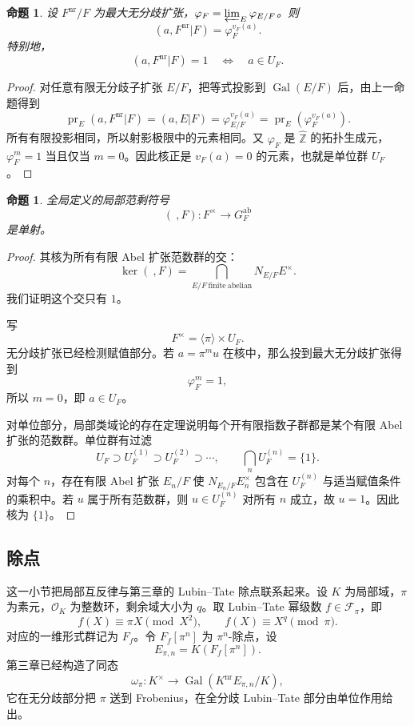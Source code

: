 \documentclass[11pt,a4paper,openany]{ctexbook}
\numberwithin{equation}{chapter}
\newcommand{\Z}{\mathbb{Z}}
\newcommand{\Gal}{\operatorname{Gal}}
\theoremstyle{plain}
\newtheorem{proposition}[theorem]{命题}
\theoremstyle{definition}
\theoremstyle{remark}
\begin{document}
\begin{proposition}
设 $F^{\mathrm{nr}}/F$ 为最大无分歧扩张，$\varphi_F=\varprojlim_E\varphi_{E/F}$。则
\[
(a,F^{\mathrm{nr}}|F)=\varphi_F^{v_F(a)}.
\]
特别地，
\[
(a,F^{\mathrm{nr}}|F)=1\quad\Longleftrightarrow\quad a\in U_F.
\]
\end{proposition}

\begin{proof}
对任意有限无分歧子扩张 $E/F$，把等式投影到 $\Gal(E/F)$ 后，由上一命题得到
\[
\operatorname{pr}_E(a,F^{\mathrm{nr}}|F)=(a,E|F)=\varphi_{E/F}^{v_F(a)}
=\operatorname{pr}_E(\varphi_F^{v_F(a)}).
\]
所有有限投影相同，所以射影极限中的元素相同。又 $\varphi_F$ 是 $\widehat{\Z}$ 的拓扑生成元，$\varphi_F^m=1$ 当且仅当 $m=0$。因此核正是 $v_F(a)=0$ 的元素，也就是单位群 $U_F$。
\end{proof}

\begin{proposition}
全局定义的局部范剩符号
\[
(\ ,F):F^\times\longrightarrow G_F^{\operatorname{ab}}
\]
是单射。
\end{proposition}

\begin{proof}
其核为所有有限 Abel 扩张范数群的交：
\[
\ker(\ ,F)=\bigcap_{E/F\ \mathrm{finite\ abelian}}N_{E/F}E^\times.
\]
我们证明这个交只有 $1$。

写
\[
F^\times=\langle\pi\rangle\times U_F.
\]
无分歧扩张已经检测赋值部分。若 $a=\pi^m u$ 在核中，那么投到最大无分歧扩张得到
\[
\varphi_F^{m}=1,
\]
所以 $m=0$，即 $a\in U_F$。

对单位部分，局部类域论的存在定理说明每个开有限指数子群都是某个有限 Abel 扩张的范数群。单位群有过滤
\[
U_F\supset U_F^{(1)}\supset U_F^{(2)}\supset\cdots,\qquad \bigcap_n U_F^{(n)}=\{1\}.
\]
对每个 $n$，存在有限 Abel 扩张 $E_n/F$ 使 $N_{E_n/F}E_n^\times$ 包含在 $U_F^{(n)}$ 与适当赋值条件的乘积中。若 $u$ 属于所有范数群，则 $u\in U_F^{(n)}$ 对所有 $n$ 成立，故 $u=1$。因此核为 $\{1\}$。
\end{proof}

\subsection{除点}

这一小节把局部互反律与第三章的 Lubin--Tate 除点联系起来。设 $K$ 为局部域，$\pi$ 为素元，$\mathcal O_K$ 为整数环，剩余域大小为 $q$。取 Lubin--Tate 幂级数 $f\in\mathcal F_\pi$，即
\[
f(X)\equiv \pi X\pmod{X^2},\qquad f(X)\equiv X^q\pmod{\pi}.
\]
对应的一维形式群记为 $F_f$。令 $F_f[\pi^n]$ 为 $\pi^n$-除点，设
\[
E_{\pi,n}=K(F_f[\pi^n]).
\]
第三章已经构造了同态
\[
\omega_\pi:K^\times\longrightarrow \Gal(K^{\mathrm{nr}}E_{\pi,n}/K),
\]
它在无分歧部分把 $\pi$ 送到 Frobenius，在全分歧 Lubin--Tate 部分由单位作用给出。
\end{document}
